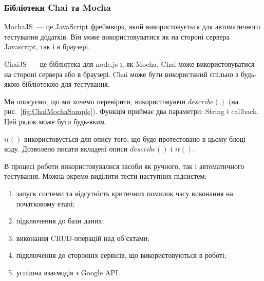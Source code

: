 \subsubsection{Бібліотеки Chai та Mocha}


MochaJS~--- це JavaScript фреймворк, який використовується для автоматичного тестування додатків. Він може використовуватися як на стороні сервера Javascript, так і в браузері. 

ChaiJS~--- це бібліотека для node.js і, як Mocha, Chai може використовуватися на стороні сервера або в браузері. Chai може бути використаний спільно з будь-якою бібліотекою для тестування.

Ми описуємо, що ми хочемо перевірити, використовуючи $describe()$ (на рис.~\ref{fig:ChaiMochaSample}). Функція приймає два параметри: String і callback. Цей рядок може бути будь-яким.

$it()$ використовується для опису того, що буде протестовано в цьому блоці коду. Дозволено писати вкладені описи $describe()$ і $it()$.

В процесі роботи використовувалися засоби як ручного, так і автоматичного тестування. 
Можна окремо виділити тести наступних підсистем:

\begin{enumerate}
    \item запуск системи та відсутність  критичних помилок часу виконання на початковому етапі;
    \item підключення до бази даних;
    \item виконання CRUD-операцій над об'єктами;
    \item підключення до сторонніх сервісів, що використовуються в роботі;
    \item успішна взаємодія з Google API.
\end{enumerate}


